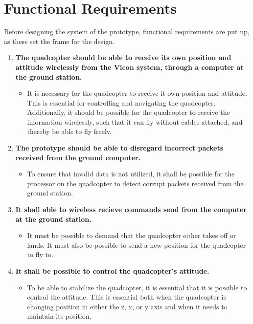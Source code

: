 \chapter{Functional Requirements}
\label{ch:functionalRequirements}
Before designing the system of the prototype, functional requirements are put up, as these set the frame for the design.  

\begin{enumerate}[label=\textbf{\arabic*})]


\item \textbf{The quadcopter should be able to receive its own position and attitude wirelessly from the Vicon system, through a computer at the ground station.}
\begin{itemize}
\item[] It is necessary for the quadcopter to receive it own position and attitude. This is essential for controlling and navigating the quadcopter. Additionally, it should be possible for the quadcopter to receive the information wirelessly, such that it can fly without cables attached, and thereby be able to fly freely.
\end{itemize}


\item \textbf{The prototype should be able to disregard incorrect packets received from the ground computer.}
\begin{itemize}
\item[] To ensure that invalid data is not utilized, it shall be possible for the processor on the quadcopter to detect corrupt packets received from the ground station.
\end{itemize}


\item \textbf{It shall able to wireless recieve commands send from the  computer at the ground station.}
\begin{itemize}
\item[] It must be possible to demand that the quadcopter either takes off or lands. It must also be possible to send a new position for the quadcopter to fly to.  
\end{itemize}


\item \textbf{It shall be possible to control the quadcopter's attitude.}
\begin{itemize}
\item[] To be able to stabilize the quadcopter, it is essential that it is possible to control the attitude. This is essential both when the quadcopter is changing position in either the z, x, or y axis and when it needs to maintain its position.
\end{itemize}



\end{enumerate}

